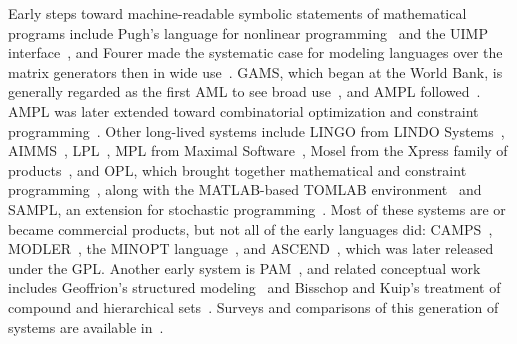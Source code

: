 \documentclass[11pt]{article}
\begin{document}
Early steps toward machine-readable symbolic statements of mathematical programs include Pugh's language for nonlinear programming~\cite{pugh1972} and the UIMP interface~\cite{ellison1982}, and Fourer made the systematic case for modeling languages over the matrix generators then in wide use~\cite{fourer1983}. GAMS, which began at the World Bank, is generally regarded as the first AML to see broad use~\cite{bisschop1982,meeraus1983,brooke1988,bussieck2004}, and AMPL followed~\cite{fourer1990,fourer2003,fourer2004}. AMPL was later extended toward combinatorial optimization and constraint programming~\cite{fourer1998,fourer2002}. Other long-lived systems include LINGO from LINDO Systems~\cite{cunningham2004}, AIMMS~\cite{bisschop2004}, LPL~\cite{hurlimann1988,hurlimann2004}, MPL from Maximal Software~\cite{kristjansson2004}, Mosel from the Xpress family of products~\cite{colombani2004}, and OPL, which brought together mathematical and constraint programming~\cite{vanhentenryck1999,vanhentenryck2004}, along with the MATLAB-based TOMLAB environment~\cite{holmstrom2004} and SAMPL, an extension for stochastic programming~\cite{valente2009}. Most of these systems are or became commercial products, but not all of the early languages did: CAMPS~\cite{lucas1988}, MODLER~\cite{greenberg1992modler}, the MINOPT language~\cite{schweiger2004}, and ASCEND~\cite{piela1991}, which was later released under the GPL. Another early system is PAM~\cite{welch1987}, and related conceptual work includes Geoffrion's structured modeling~\cite{geoffrion1987} and Bisschop and Kuip's treatment of compound and hierarchical sets~\cite{bisschop1993compound,bisschop1993hier}. Surveys and comparisons of this generation of systems are available in~\cite{greenberg1992comparison,kuip1993,rosenthal2001,kallrath2004intro,kallrath2012,fourer2013}.
\end{document}

